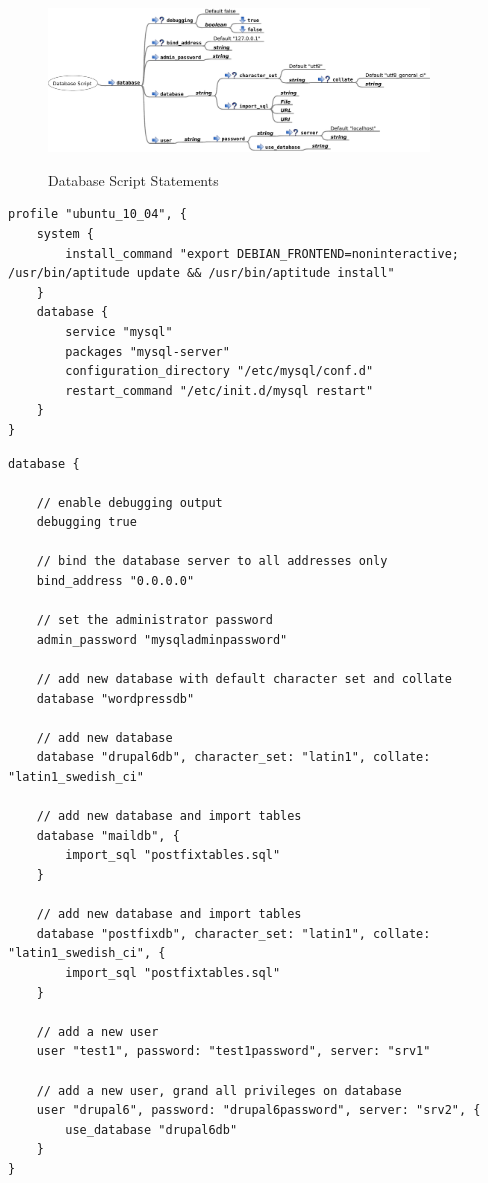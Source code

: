 \begin{figure}
\includegraphics[width=0.9\textwidth]{database_service_script}
\label{fig:database_script_statements}
\caption{Database Script Statements}
\end{figure}

\begin{lstlisting}[style=Java,label=lst:database_ubuntu_profile,caption=Database Example Ubuntu Profile]
profile "ubuntu_10_04", {
    system {
        install_command "export DEBIAN_FRONTEND=noninteractive; /usr/bin/aptitude update && /usr/bin/aptitude install"
    }
    database {
        service "mysql"
        packages "mysql-server"
        configuration_directory "/etc/mysql/conf.d"
        restart_command "/etc/init.d/mysql restart"
    }
}
\end{lstlisting}


\begin{lstlisting}[style=Java,label=lst:database_example_script,caption=Database Example Script]
database {

    // enable debugging output
    debugging true

    // bind the database server to all addresses only
    bind_address "0.0.0.0"

    // set the administrator password
    admin_password "mysqladminpassword"

    // add new database with default character set and collate
    database "wordpressdb"

    // add new database
    database "drupal6db", character_set: "latin1", collate: "latin1_swedish_ci"

    // add new database and import tables
    database "maildb", {
        import_sql "postfixtables.sql"
    }

    // add new database and import tables
    database "postfixdb", character_set: "latin1", collate: "latin1_swedish_ci", {
        import_sql "postfixtables.sql"
    }

    // add a new user
    user "test1", password: "test1password", server: "srv1"

    // add a new user, grand all privileges on database
    user "drupal6", password: "drupal6password", server: "srv2", {
        use_database "drupal6db"
    }
}
\end{lstlisting}

